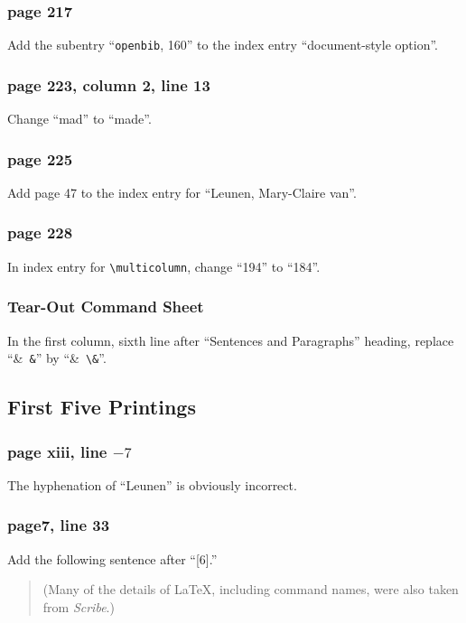 \subsubsection*{page 217}
Add the subentry ``{\tt openbib}, 160'' to the index entry
``document-style option''.


\subsubsection*{page 223, column 2, line 13}
Change ``mad'' to ``made''.

\subsubsection*{page 225}
Add page 47 to the index entry for ``Leunen, Mary-Claire van''.

\subsubsection*{page 228}
In index entry for \verb|\multicolumn|, change ``194''
to ``184''.


\subsubsection*{Tear-Out Command Sheet}

In the first column, sixth line after ``Sentences and Paragraphs'' heading, 
replace ``\hbox{\& \verb|&|}'' by ``\hbox{\& \verb|\&|}''.

\subsection{First Five Printings}

\subsubsection*{page xiii, line $-7$}
The hyphenation of ``Leunen'' is obviously incorrect.

\subsubsection*{page7, line 33}
Add the following sentence after ``[6].''
\begin{quote}
(Many of the details of \LaTeX, including command names, were also
taken from {\em Scribe}.)
\end{quote}

